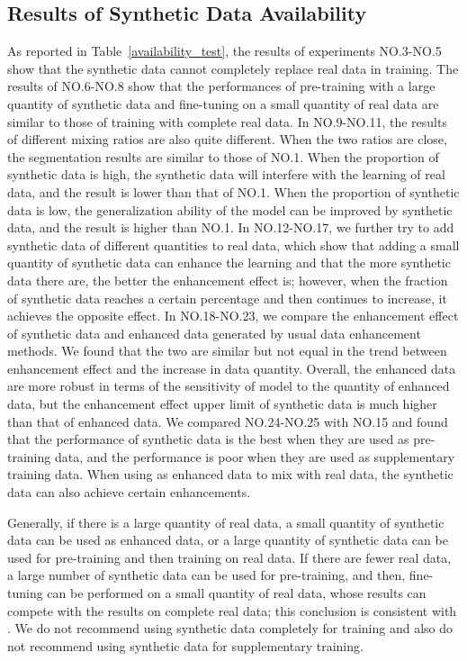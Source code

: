 \documentclass[runningheads]{llncs}
\begin{document}
\subsection{Results of Synthetic Data Availability}
As reported in Table~\ref{availability_test}, the results of experiments NO.3-NO.5 show that the synthetic data cannot completely replace real data in training.           
The results of NO.6-NO.8 show that the performances of pre-training with a large quantity of synthetic data and fine-tuning on a small quantity of real data are similar to those of training with complete real data.  
In NO.9-NO.11, the results of different mixing ratios are also quite different. When the two ratios are close, the segmentation results are similar to those of NO.1. When the proportion of synthetic data is high, the synthetic data will interfere with the learning of real data, and the result is lower than that of NO.1. When the proportion of synthetic data is low, the generalization ability of the model can be improved by synthetic data, and the result is higher than NO.1.           
In NO.12-NO.17, we further try to add synthetic data of different quantities to real data, which show that adding a small quantity of synthetic data can enhance the learning and that the more synthetic data there are, the better the enhancement effect is; however, when the fraction of synthetic data reaches a certain percentage and then continues to increase, it achieves the opposite effect. 
In NO.18-NO.23, we compare the enhancement effect of synthetic data and enhanced data generated by usual data enhancement methods. We found that the two are similar but not equal in the trend between  enhancement effect and the increase in data quantity. Overall, the enhanced data are more robust in terms of the sensitivity of model to the quantity of enhanced data, but the enhancement effect upper limit of synthetic data is much higher than that of enhanced data.  
We compared NO.24-NO.25 with NO.15 and found that the performance of synthetic data is the best when they are used as pre-training data, and the performance is poor when they are used as supplementary training data. When using as enhanced data to mix with real data, the synthetic data can also achieve certain enhancements.

Generally, if there is a large quantity of real data, a small quantity of synthetic data can be used as enhanced data, or a large quantity of synthetic data can be used for pre-training and then training on real data. If there are fewer real data, a large number of synthetic data can be used for pre-training, and then, fine-tuning can be performed on a small quantity of real data, whose results can compete with the results on complete real data; this conclusion is consistent with \cite{4shin2018medical}. We do not recommend using synthetic data completely for training and also do not recommend using synthetic data for supplementary training.
\end{document}
